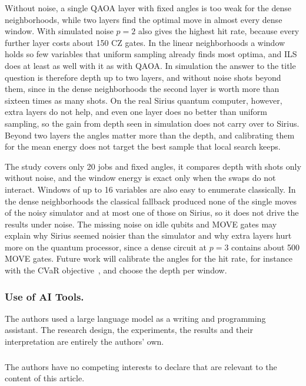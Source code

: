 \documentclass[runningheads]{llncs}
\begin{document}
Without noise, a single QAOA layer with fixed angles is too weak for the
dense neighborhoods, while two layers find the optimal move in almost every
dense window. With simulated noise $p = 2$ also gives the highest hit rate,
because every further layer costs about 150 CZ gates. In the linear
neighborhoods a window holds so few variables that uniform sampling already
finds most optima, and ILS does at least as well with it as with QAOA.
In simulation the answer to the title question is therefore depth up to two
layers, and without noise shots beyond them, since in the dense neighborhoods the second
layer is worth more than sixteen times as many shots. On the real Sirius quantum computer, however,
extra layers do not help, and even one layer does no better than uniform
sampling, so the gain from depth seen in simulation does not carry over to
Sirius. Beyond two layers the angles matter more than the depth, and
calibrating them for the mean energy does not target the best sample that local search keeps.

The study covers only 20 jobs and fixed angles, it
compares depth with shots only without noise, and the window energy is exact
only when the swaps do not interact. Windows of up to 16 variables are also
easy to enumerate classically. In the dense neighborhoods the classical
fallback produced none of the single moves of the noisy simulator and at
most one of those on Sirius, so it does not drive the results under noise.
The missing noise on idle qubits and MOVE gates may explain why Sirius seemed
noisier than the simulator and why extra layers hurt more on the quantum processor,
since a dense circuit at $p = 3$ contains about 500 MOVE gates. Future work will
calibrate the angles for the hit rate, for
instance with the CVaR objective~\cite{barkoutsos2020cvar}, and choose the
depth per window.

\begin{credits}
\subsubsection{Use of AI Tools.} The authors used a large language model as
a writing and programming assistant. The research design, the experiments,
the results and their interpretation are entirely the authors' own.

\subsubsection{\discintname} The authors have no competing interests to
declare that are relevant to the content of this article.
\end{credits}



\end{document}
